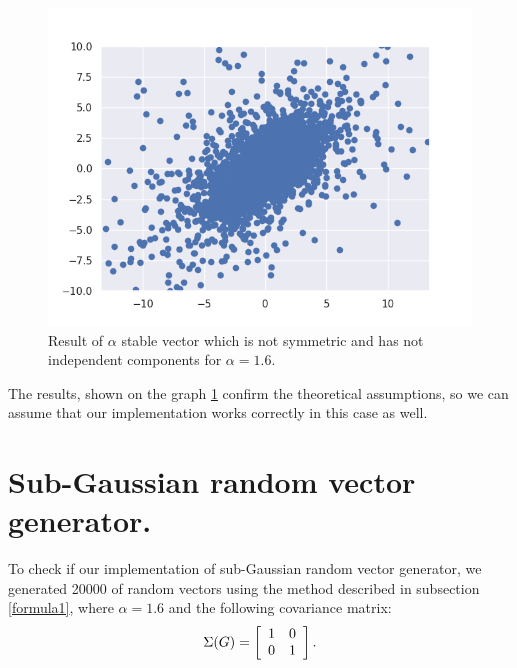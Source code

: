 \documentclass{article}
\begin{document}
	\begin{figure}[H]
		\centering
		\includegraphics[width=1\linewidth]{images/ex_1_c_alpha_stable_vector_simulation_symmetric_discreet_scatter}
		\caption{Result of $\alpha$ stable vector which is not symmetric and has not independent components for $\alpha=1.6$.}\label{3}
	\end{figure}
	The results, shown on the graph \ref{3} confirm the theoretical assumptions, so we can assume that our implementation works correctly in this case as well.
	
	\section{Sub-Gaussian random vector generator.}\label{sec2}
	
	To check if our implementation of sub-Gaussian random vector generator, we generated 20000 of random vectors using the method described in subsection \ref{formula1}, where $\alpha = 1.6$ and the following covariance matrix:
	\begin{equation*}
		\Sigma(G) = \left[{\begin{array}{*{20}c}
			1 & 0\\
			0 & 1\end{array} } \right].
	\end{equation*}
	
\end{document}
